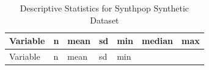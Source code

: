 \documentclass[
  letterpaper,
  DIV=11,
  numbers=noendperiod]{scrartcl}
\begin{document}
\begin{longtable}[]{@{}
  >{\raggedright\arraybackslash}p{}
  >{\raggedleft\arraybackslash}p{}
  >{\raggedleft\arraybackslash}p{}
  >{\raggedleft\arraybackslash}p{}
  >{\raggedleft\arraybackslash}p{}
  >{\raggedleft\arraybackslash}p{}
  >{\raggedleft\arraybackslash}p{}@{}}
\caption{Descriptive Statistics for Synthpop Synthetic
Dataset}\tabularnewline
\toprule\noalign{}
\begin{minipage}[b]{\linewidth}\raggedright
Variable
\end{minipage} & \begin{minipage}[b]{\linewidth}\raggedleft
n
\end{minipage} & \begin{minipage}[b]{\linewidth}\raggedleft
mean
\end{minipage} & \begin{minipage}[b]{\linewidth}\raggedleft
sd
\end{minipage} & \begin{minipage}[b]{\linewidth}\raggedleft
min
\end{minipage} & \begin{minipage}[b]{\linewidth}\raggedleft
median
\end{minipage} & \begin{minipage}[b]{\linewidth}\raggedleft
max
\end{minipage} \\
\midrule\noalign{}
\endfirsthead
\toprule\noalign{}
\begin{minipage}[b]{\linewidth}\raggedright
Variable
\end{minipage} & \begin{minipage}[b]{\linewidth}\raggedleft
n
\end{minipage} & \begin{minipage}[b]{\linewidth}\raggedleft
mean
\end{minipage} & \begin{minipage}[b]{\linewidth}\raggedleft
sd
\end{minipage} & \begin{minipage}[b]{\linewidth}\raggedleft
min
\end{minipage} & \begin{minipage}[b]{\linewidth}\raggedleft

\end{minipage}
\end{longtable}
\end{document}
